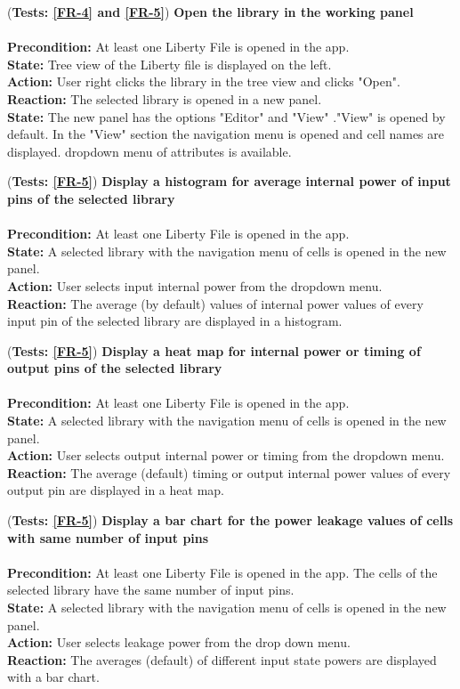 \documentclass[10pt,a4paper]{report}
\newcommand{\precondition}[1]{
    \textbf{Precondition: } #1 \leavevmode \\
}
\newcommand{\action}[1]{
    \textbf{Action: } #1 \leavevmode \\
}
\newcommand{\state}[1]{
    \textbf{State: } #1 \leavevmode \\
}
\newcommand{\reaction}[1]{
    \textbf{Reaction: } #1 \leavevmode \\
}
\newcommand{\GTCDescription}[2]{
    (\textbf{Tests: #1}) \textbf{#2} \leavevmode \\
}
\begin{document}
\begin{GTC}
    \item \GTCDescription{\ref{FR-4} and \ref{FR-5}}
    {Open the library in the working panel} \leavevmode \\ 
        \precondition{At least one Liberty File is opened in the app.}
        \state{Tree view of the Liberty file is displayed on the left.}
        \action{User right clicks the library in the tree view and clicks "Open".}
        \reaction{The selected library is opened in a new panel.}
        \state{The new panel has the options "Editor" and "View" ."View" is opened by default. In the "View" section the navigation menu is opened and cell names are displayed. dropdown menu of attributes is available.}\label{GTC-7}
    
    \item \GTCDescription{\ref{FR-5}}
    {Display a histogram for average internal power of input pins of the selected library} \leavevmode \\ 
        \precondition{At least one Liberty File is opened in the app. }
        \state{A selected library with the navigation menu of cells is opened in the new panel.}
        \action{User selects input internal power from the dropdown menu. }
        \reaction{The average (by default) values of internal power values of every input pin of the selected library are displayed in a histogram.}\label{GTC-8}
    
    \item \GTCDescription{\ref{FR-5}}
    {Display a heat map for internal power or timing of output pins of the selected library} \leavevmode \\ 
        \precondition{At least one Liberty File is opened in the app.}
        \state{A selected library with the navigation menu of cells is opened in the new panel.}
        \action{User selects output internal power or timing from the dropdown menu.}
        \reaction{The average (default) timing or output internal power values of every output pin are displayed in a heat map.}\label{GTC-9}
    
    \item \GTCDescription{\ref{FR-5}}
    {Display a bar chart for the power leakage values of cells with same number of input pins} \leavevmode \\ 
        \precondition{At least one Liberty File is opened in the app. The cells of the selected library have the same number of input pins.}
        \state{A selected library with the navigation menu of cells is opened in the new panel.}
        \action{User selects leakage power from the drop down menu.}
        \reaction{The averages (default) of different input state powers are displayed with a bar chart.} \label{GTC-10}
    

\end{GTC}
\end{document}
